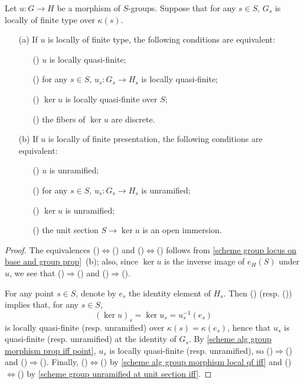 \begin{corollary}\label{scheme group morphism local qf or unram iff}
Let $u:G\to H$ be a morphism of $S$-groups. Suppose that for any $s\in S$, $G_s$ is locally of finite type over $\kappa(s)$.
\begin{enumerate}
    \item[(a)] If $u$ is locally of finite type, the following conditions are equivalent:
    \begin{enumerate}
        \item[(\rmnum{1})] $u$ is locally quasi-finite;
        \item[(\rmnum{2})] for any $s\in S$, $u_s:G_s\to H_s$ is locally quasi-finite;
        \item[(\rmnum{3})] $\ker u$ is locally quasi-finite over $S$;
        \item[(\rmnum{4})] the fibers of $\ker u$ are discrete.
    \end{enumerate}
    \item[(b)] If $u$ is locally of finite presentation, the following conditions are equivalent:
    \begin{enumerate}
        \item[(\rmnum{5})] $u$ is unramified;
        \item[(\rmnum{6})] for any $s\in S$, $u_s:G_s\to H_s$ is unramified;
        \item[(\rmnum{7})] $\ker u$ is unramified;
        \item[(\rmnum{8})] the unit section $S\to\ker u$ is an open immersion.
    \end{enumerate}
\end{enumerate}
\end{corollary}
\begin{proof}
The equivalences ()$\Leftrightarrow$() and ()$\Leftrightarrow$() follows from \cref{scheme group locus on base and group prop}~(b); also, since $\ker u$ is the inverse image of $e_H(S)$ under $u$, we see that ()$\Rightarrow$() and ()$\Rightarrow$().\par
For any point $s\in S$, denote by $e_s$ the identity element of $H_s$. Then () (resp. ()) implies that, for any $s\in S$,
\[(\ker u)_s=\ker u_s=u_s^{-1}(e_s)\]
is locally quasi-finite (resp. unramified) over $\kappa(s)=\kappa(e_s)$, hence that $u_s$ is quasi-finite (resp. unramified) at the identity of $G_s$. By \cref{scheme alg group morphism prop iff point}, $u_s$ is locally quasi-finite (resp. unramified), so ()$\Rightarrow$() and ()$\Rightarrow$(). Finally, ()$\Leftrightarrow$() by \cref{scheme alg group morphism local qf iff} and ()$\Leftrightarrow$() by \cref{scheme group unramified at unit section iff}.
\end{proof} 

